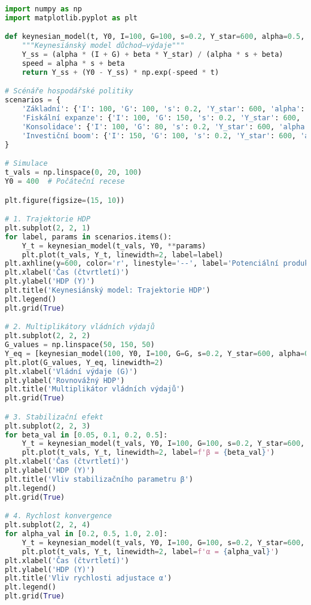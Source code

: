 \begin{example}
\begin{lstlisting}[language=Python, caption={Implementace Keynesiánského modelu v~Pythonu}]
import numpy as np
import matplotlib.pyplot as plt

def keynesian_model(t, Y0, I=100, G=100, s=0.2, Y_star=600, alpha=0.5, beta=0.1):
    """Keynesiánský model důchod–výdaje"""
    Y_ss = (alpha * (I + G) + beta * Y_star) / (alpha * s + beta)
    speed = alpha * s + beta
    return Y_ss + (Y0 - Y_ss) * np.exp(-speed * t)

# Scénáře hospodářské politiky
scenarios = {
    'Základní': {'I': 100, 'G': 100, 's': 0.2, 'Y_star': 600, 'alpha': 0.5, 'beta': 0.1},
    'Fiskální expanze': {'I': 100, 'G': 150, 's': 0.2, 'Y_star': 600, 'alpha': 0.5, 'beta': 0.1},
    'Konsolidace': {'I': 100, 'G': 80, 's': 0.2, 'Y_star': 600, 'alpha': 0.5, 'beta': 0.1},
    'Investiční boom': {'I': 150, 'G': 100, 's': 0.2, 'Y_star': 600, 'alpha': 0.5, 'beta': 0.1}
}

# Simulace
t_vals = np.linspace(0, 20, 100)
Y0 = 400  # Počáteční recese

plt.figure(figsize=(15, 10))

# 1. Trajektorie HDP
plt.subplot(2, 2, 1)
for label, params in scenarios.items():
    Y_t = keynesian_model(t_vals, Y0, **params)
    plt.plot(t_vals, Y_t, linewidth=2, label=label)
plt.axhline(y=600, color='r', linestyle='--', label='Potenciální produkt')
plt.xlabel('Čas (čtvrtletí)')
plt.ylabel('HDP (Y)')
plt.title('Keynesiánský model: Trajektorie HDP')
plt.legend()
plt.grid(True)

# 2. Multiplikátory vládních výdajů
plt.subplot(2, 2, 2)
G_values = np.linspace(50, 150, 50)
Y_eq = [keynesian_model(100, Y0, I=100, G=G, s=0.2, Y_star=600, alpha=0.5, beta=0.1) for G in G_values]
plt.plot(G_values, Y_eq, linewidth=2)
plt.xlabel('Vládní výdaje (G)')
plt.ylabel('Rovnovážný HDP')
plt.title('Multiplikátor vládních výdajů')
plt.grid(True)

# 3. Stabilizační efekt
plt.subplot(2, 2, 3)
for beta_val in [0.05, 0.1, 0.2, 0.5]:
    Y_t = keynesian_model(t_vals, Y0, I=100, G=100, s=0.2, Y_star=600, alpha=0.5, beta=beta_val)
    plt.plot(t_vals, Y_t, linewidth=2, label=f'β = {beta_val}')
plt.xlabel('Čas (čtvrtletí)')
plt.ylabel('HDP (Y)')
plt.title('Vliv stabilizačního parametru β')
plt.legend()
plt.grid(True)

# 4. Rychlost konvergence
plt.subplot(2, 2, 4)
for alpha_val in [0.2, 0.5, 1.0, 2.0]:
    Y_t = keynesian_model(t_vals, Y0, I=100, G=100, s=0.2, Y_star=600, alpha=alpha_val, beta=0.1)
    plt.plot(t_vals, Y_t, linewidth=2, label=f'α = {alpha_val}')
plt.xlabel('Čas (čtvrtletí)')
plt.ylabel('HDP (Y)')
plt.title('Vliv rychlosti adjustace α')
plt.legend()
plt.grid(True)


\end{lstlisting}
\end{example}
